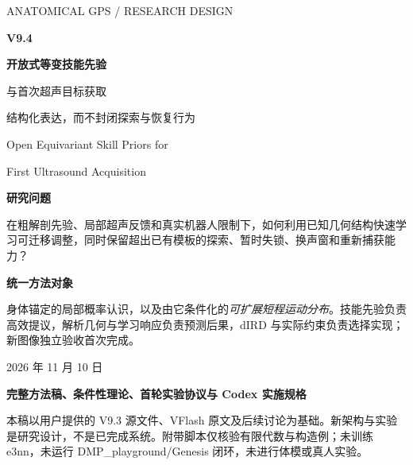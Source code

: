 \documentclass[UTF8,fontset=fandol,11pt,a4paper]{ctexart}
\theoremstyle{plain}
\theoremstyle{definition}
\theoremstyle{remark}
\numberwithin{equation}{section}
\begin{document}
\begin{titlepage}
\vspace*{6mm}
{\Large\sffamily\color{accent}ANATOMICAL GPS / RESEARCH DESIGN}\par
\vspace{12mm}
{\fontsize{38}{44}\selectfont\bfseries\color{ink}V9.4}\par
\vspace{8mm}
{\fontsize{24}{34}\selectfont\bfseries\color{ink}开放式等变技能先验\par 与首次超声目标获取}\par
\vspace{6mm}
{\Large 结构化表达，而不封闭探索与恢复行为}\par
\vspace{8mm}
{\large Open Equivariant Skill Priors for\par First Ultrasound Acquisition}\par
\vspace{8mm}
\begin{corebox}
\textbf{研究问题}\par
在粗解剖先验、局部超声反馈和真实机器人限制下，如何利用已知几何结构快速学习可迁移调整，同时保留超出已有模板的探索、暂时失锁、换声窗和重新捕获能力？
\medskip\par
\textbf{统一方法对象}\par
身体锚定的局部概率认识，以及由它条件化的\emph{可扩展短程运动分布}。技能先验负责高效提议，解析几何与学习响应负责预测后果，dIRD 与实际约束负责选择实现；新图像独立验收首次完成。
\end{corebox}
\vfill
2026 年 11 月 10 日\par
\vspace{3mm}
\textbf{完整方法稿、条件性理论、首轮实验协议与 Codex 实施规格}\par
\vspace{4mm}
{\small 本稿以用户提供的 V9.3 源文件、VFlash 原文及后续讨论为基础。新架构与实验是研究设计，不是已完成系统。附带脚本仅核验有限代数与构造例；未训练 e3nn，未运行 DMP\_playground/Genesis 闭环，未进行体模或真人实验。}
\end{titlepage}
\end{document}
